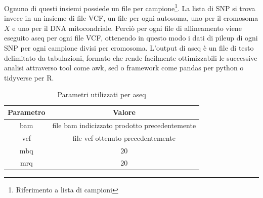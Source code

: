   Ognuno di questi insiemi possiede un file per campione\footnote{Riferimento a lista di campioni}.
  La lista di SNP si trova invece in un insieme di file VCF, un file per ogni autosoma, uno per il cromosoma $X$ e uno per il DNA mitocondriale.
  Perci\`o per ogni file di allineamento viene eseguito aseq per ogni file VCF, ottenendo in questo modo i dati di pileup di ogni SNP per ogni campione divisi per cromosoma.
  L'output di aseq \`e un file di testo delimitato da tabulazioni, formato che rende facilmente ottimizzabili le successive analisi attraverso tool come awk, sed o framework come pandas per python o tidyverse per R.
  \begin{table}[H]
        \begin{tabular}{|c|c|}
                \hline
                Parametro & Valore\\
                \hline
                bam & file bam indicizzato prodotto precedentemente\\
                \hline
                vcf & file vcf ottenuto precedentemente\\
                \hline
                mbq & $20$\\
                \hline
                mrq & $20$\\
                \hline
         \end{tabular}
         \centering
         \caption{Parametri utilizzati per aseq}
   \end{table}
